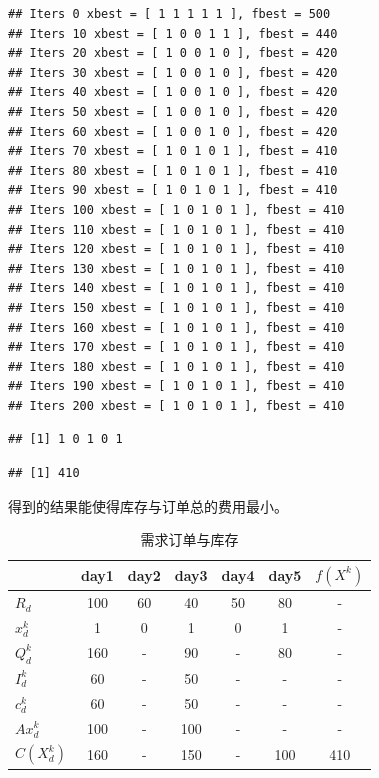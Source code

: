 \documentclass[]{ctexbook}
\newenvironment{Shaded}{\begin{snugshade}}{\end{snugshade}}
\newcommand{\OperatorTok}[1]{\textcolor[rgb]{0.81,0.36,0.00}{\textbf{#1}}}
\newcommand{\NormalTok}[1]{#1}
\begin{document}
\begin{verbatim}
## Iters 0 xbest = [ 1 1 1 1 1 ], fbest = 500 
## Iters 10 xbest = [ 1 0 0 1 1 ], fbest = 440 
## Iters 20 xbest = [ 1 0 0 1 0 ], fbest = 420 
## Iters 30 xbest = [ 1 0 0 1 0 ], fbest = 420 
## Iters 40 xbest = [ 1 0 0 1 0 ], fbest = 420 
## Iters 50 xbest = [ 1 0 0 1 0 ], fbest = 420 
## Iters 60 xbest = [ 1 0 0 1 0 ], fbest = 420 
## Iters 70 xbest = [ 1 0 1 0 1 ], fbest = 410 
## Iters 80 xbest = [ 1 0 1 0 1 ], fbest = 410 
## Iters 90 xbest = [ 1 0 1 0 1 ], fbest = 410 
## Iters 100 xbest = [ 1 0 1 0 1 ], fbest = 410 
## Iters 110 xbest = [ 1 0 1 0 1 ], fbest = 410 
## Iters 120 xbest = [ 1 0 1 0 1 ], fbest = 410 
## Iters 130 xbest = [ 1 0 1 0 1 ], fbest = 410 
## Iters 140 xbest = [ 1 0 1 0 1 ], fbest = 410 
## Iters 150 xbest = [ 1 0 1 0 1 ], fbest = 410 
## Iters 160 xbest = [ 1 0 1 0 1 ], fbest = 410 
## Iters 170 xbest = [ 1 0 1 0 1 ], fbest = 410 
## Iters 180 xbest = [ 1 0 1 0 1 ], fbest = 410 
## Iters 190 xbest = [ 1 0 1 0 1 ], fbest = 410 
## Iters 200 xbest = [ 1 0 1 0 1 ], fbest = 410
\end{verbatim}

\begin{Shaded}
\end{Shaded}

\begin{verbatim}
## [1] 1 0 1 0 1
\end{verbatim}

\begin{verbatim}
## [1] 410
\end{verbatim}

得到的结果能使得库存与订单总的费用最小。

\begin{table}[t]

\caption{\label{tab:lotsizingtable}需求订单与库存}
\centering
\begin{tabular}{lcccccc}
\toprule
  & day1 & day2 & day3 & day4 & day5 & $f(X^k)$\\
\midrule
$R_d$ & 100 & 60 & 40 & 50 & 80 & -\\
$x_d^k$ & 1 & 0 & 1 & 0 & 1 & -\\
$Q_d^k$ & 160 & - & 90 & - & 80 & -\\
$I_d^k$ & 60 & - & 50 & - & - & -\\
$c_d^k$ & 60 & - & 50 & - & - & -\\
\addlinespace
$Ax_d^k$ & 100 & - & 100 & - & - & -\\
$C(X_d^k)$ & 160 & - & 150 & - & 100 & 410\\
\bottomrule
\end{tabular}
\end{table}
\end{document}
